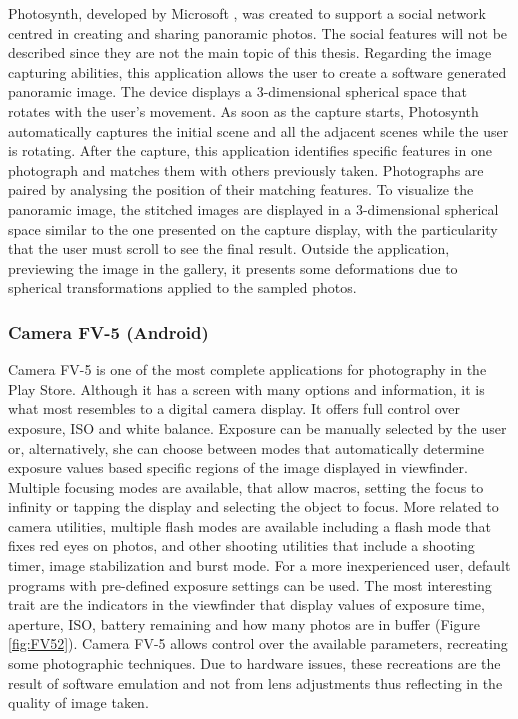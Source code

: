 Photosynth, developed by Microsoft \cite{Photosynth}, was created to support a social network centred in creating and sharing panoramic photos. The social features will not be described since they are not the main topic of this thesis.
Regarding the image capturing abilities, this application allows the user to create a software generated panoramic image. The device displays a 3-dimensional spherical space that rotates with the user's movement. As soon as the capture starts, Photosynth automatically captures the initial scene and all the adjacent scenes while the user is rotating. After the capture, this application identifies specific features in one photograph and matches them with others previously taken. Photographs are paired by analysing the position of their matching features. 
To visualize the panoramic image, the stitched images are displayed in a 3-dimensional spherical space similar to the one presented on the capture display, with the particularity that the user must scroll to see the final result. Outside the application, previewing the image in the gallery, it presents some deformations due to spherical transformations applied to the sampled photos. 


\subsubsection{Camera FV-5 (Android)}

Camera FV-5 \cite{FV5} is one of the most complete applications for photography in the Play Store. Although it has a screen with many options and information, it is what most resembles to a digital camera display. It offers full control over exposure, ISO and white balance. Exposure can be manually selected by the user or, alternatively, she can choose between modes that automatically determine exposure values based specific regions of the image displayed in viewfinder. 
Multiple focusing modes are available, that allow macros, setting the focus to infinity or tapping the display and selecting the object to focus.
More related to camera utilities, multiple flash modes are available including a flash mode that fixes red eyes on photos, and other shooting utilities that include a shooting timer, image stabilization and burst mode.
For a more inexperienced user, default programs with pre-defined exposure settings can be used.
The most interesting trait are the indicators in the viewfinder that display values of exposure time, aperture, ISO, battery remaining and how many photos are in buffer (Figure \ref{fig:FV52}).
Camera FV-5 allows control over the available parameters, recreating some photographic techniques. Due to hardware issues, these recreations are the result of software emulation and not from lens adjustments thus reflecting in the quality of image taken.

